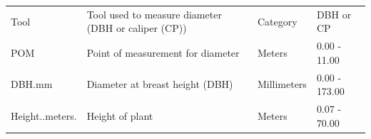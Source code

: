 \documentclass[
  12pt,
]{article}
\begin{document}
\begin{longtable}[]{@{}llll@{}}
\begin{minipage}[t]{0.18\columnwidth}
Tool\strut
\end{minipage} & \begin{minipage}[t]{0.35\columnwidth}\raggedright
Tool used to measure diameter (DBH or caliper (CP))\strut
\end{minipage} & \begin{minipage}[t]{0.18\columnwidth}\raggedright
Category\strut
\end{minipage} & \begin{minipage}[t]{0.18\columnwidth}\raggedright
DBH or CP\strut
\end{minipage}\tabularnewline
\begin{minipage}[t]{0.18\columnwidth}\raggedright
POM\strut
\end{minipage} & \begin{minipage}[t]{0.35\columnwidth}\raggedright
Point of measurement for diameter\strut
\end{minipage} & \begin{minipage}[t]{0.18\columnwidth}\raggedright
Meters\strut
\end{minipage} & \begin{minipage}[t]{0.18\columnwidth}\raggedright
0.00 - 11.00\strut
\end{minipage}\tabularnewline
\begin{minipage}[t]{0.18\columnwidth}\raggedright
DBH.mm\strut
\end{minipage} & \begin{minipage}[t]{0.35\columnwidth}\raggedright
Diameter at breast height (DBH)\strut
\end{minipage} & \begin{minipage}[t]{0.18\columnwidth}\raggedright
Millimeters\strut
\end{minipage} & \begin{minipage}[t]{0.18\columnwidth}\raggedright
0.00 - 173.00\strut
\end{minipage}\tabularnewline
\begin{minipage}[t]{0.18\columnwidth}\raggedright
Height..meters.\strut
\end{minipage} & \begin{minipage}[t]{0.35\columnwidth}\raggedright
Height of plant\strut
\end{minipage} & \begin{minipage}[t]{0.18\columnwidth}\raggedright
Meters\strut
\end{minipage} & \begin{minipage}[t]{0.18\columnwidth}\raggedright
0.07 - 70.00\strut
\end{minipage}\tabularnewline

\end{longtable}
\end{document}
